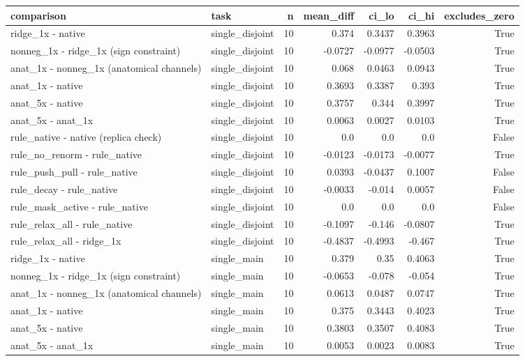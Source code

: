 \begin{table}[t]
\centering
\small
\begin{tabular}{llrrrrr}
\toprule
comparison & task & n & mean\_diff & ci\_lo & ci\_hi & excludes\_zero \\
\midrule
ridge\_1x - native & single\_disjoint & 10 & 0.374 & 0.3437 & 0.3963 & True \\
nonneg\_1x - ridge\_1x (sign constraint) & single\_disjoint & 10 & -0.0727 & -0.0977 & -0.0503 & True \\
anat\_1x - nonneg\_1x (anatomical channels) & single\_disjoint & 10 & 0.068 & 0.0463 & 0.0943 & True \\
anat\_1x - native & single\_disjoint & 10 & 0.3693 & 0.3387 & 0.393 & True \\
anat\_5x - native & single\_disjoint & 10 & 0.3757 & 0.344 & 0.3997 & True \\
anat\_5x - anat\_1x & single\_disjoint & 10 & 0.0063 & 0.0027 & 0.0103 & True \\
rule\_native - native (replica check) & single\_disjoint & 10 & 0.0 & 0.0 & 0.0 & False \\
rule\_no\_renorm - rule\_native & single\_disjoint & 10 & -0.0123 & -0.0173 & -0.0077 & True \\
rule\_push\_pull - rule\_native & single\_disjoint & 10 & 0.0393 & -0.0437 & 0.1007 & False \\
rule\_decay - rule\_native & single\_disjoint & 10 & -0.0033 & -0.014 & 0.0057 & False \\
rule\_mask\_active - rule\_native & single\_disjoint & 10 & 0.0 & 0.0 & 0.0 & False \\
rule\_relax\_all - rule\_native & single\_disjoint & 10 & -0.1097 & -0.146 & -0.0807 & True \\
rule\_relax\_all - ridge\_1x & single\_disjoint & 10 & -0.4837 & -0.4993 & -0.467 & True \\
ridge\_1x - native & single\_main & 10 & 0.379 & 0.35 & 0.4063 & True \\
nonneg\_1x - ridge\_1x (sign constraint) & single\_main & 10 & -0.0653 & -0.078 & -0.054 & True \\
anat\_1x - nonneg\_1x (anatomical channels) & single\_main & 10 & 0.0613 & 0.0487 & 0.0747 & True \\
anat\_1x - native & single\_main & 10 & 0.375 & 0.3443 & 0.4023 & True \\
anat\_5x - native & single\_main & 10 & 0.3803 & 0.3507 & 0.4083 & True \\
anat\_5x - anat\_1x & single\_main & 10 & 0.0053 & 0.0023 & 0.0083 & True \\

\end{tabular}
\end{table}
